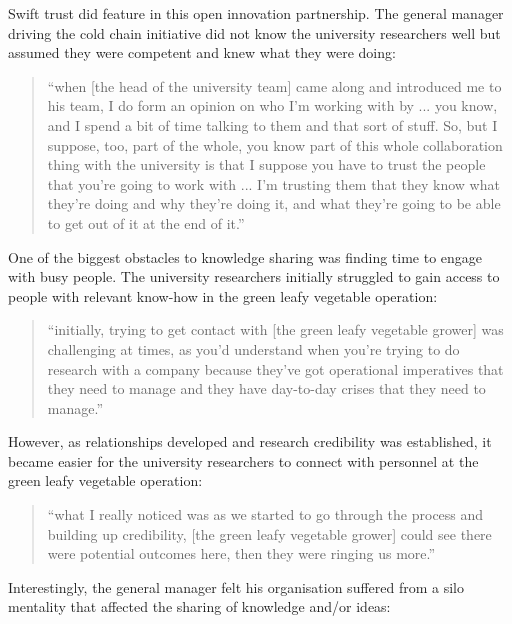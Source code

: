 Swift trust did feature in this open innovation partnership. The general manager driving the cold chain initiative did not know the university researchers well but assumed they were competent and knew what they were doing:

\begin{quote}
\small
\enquote{when [the head of the university team] came along and introduced me to his team, I do form an opinion on who I'm working with by ... you know, and I spend a bit of time talking to them and that sort of stuff. So, but I suppose, too, part of the whole, you know part of this whole collaboration thing with the university is that I suppose you have to trust the people that you’re going to work with ... I'm trusting them that they know what they're doing and why they're doing it, and what they're going to be able to get out of it at the end of it.} \\
\end{quote}
 
One of the biggest obstacles to knowledge sharing was finding time to engage with busy people. The university researchers initially struggled to gain access to people with relevant know-how in the green leafy vegetable operation:   

\begin{quote}
\small
\enquote{initially, trying to get contact with [the green leafy vegetable grower] was challenging at times, as you'd understand when you're trying to do research with a company because they've got operational imperatives that they need to manage and they have day-to-day crises that they need to manage.} \\
\end{quote}

However, as relationships developed and research credibility was established, it became easier for the university researchers to connect with personnel at the green leafy vegetable operation:

\begin{quote}
\small
\enquote{what I really noticed was as we started to go through the process and building up credibility, [the green leafy vegetable grower] could see there were potential outcomes here, then they were ringing us more.} \\
\end{quote}

Interestingly, the general manager felt his organisation suffered from a silo mentality that affected the sharing of knowledge and/or ideas: 

